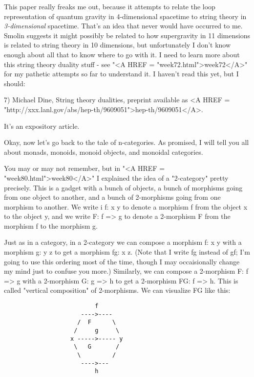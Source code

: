 This paper really freaks me out, because it attempts to relate the loop
representation of quantum gravity in 4-dimensional spacetime to string
theory in \emph{3-dimensional} spacetime.  That's an idea that never would
have occurred to me.  Smolin suggests it might possibly be related
to how supergravity in 11 dimensions is related to string theory in 10
dimensions, but unfortunately I don't know enough about all that to know
where to go with it.  I need to learn more about this string theory
duality stuff - see "<A HREF = "week72.html">week72</A>" for my pathetic attempts so far to
understand it.  I haven't read this yet, but I should:

7) Michael Dine, String theory dualities, preprint available as
<A HREF = "http://xxx.lanl.gov/abs/hep-th/9609051">hep-th/9609051</A>.  

It's an expository article.

Okay, now let's go back to the tale of n-categories.  As promised, I
will tell you all about monads, monoids, monoid objects, and monoidal
categories. 

You may or may not remember, but in "<A HREF = "week80.html">week80</A>" I explained the idea of a
"2-category" pretty precisely.  This is a gadget with a bunch of
objects, a bunch of morphisms going from one object to another, and a
bunch of 2-morphisms going from one morphism to another.  We write i
f: x \to  y to denote a morphism f from the object x to the object y, and we
write F: f => g to denote a 2-morphism F from the morphism f to the
morphism g.  

Just as in a category, in a 2-category we can compose a morphism f: x \to  y 
with a morphism g: y \to  z to get a morphism fg: x \to  z.  (Note that I
write fg instead of gf; I'm going to use this ordering most of the time,
though I may occaisionally change my mind just to confuse you more.) 
Similarly, we can compose a 2-morphism F: f => g with a 2-morphism G: g
=> h to get a 2-morphism FG: f => h.  This is called "vertical
composition" of 2-morphisms.   We can visualize FG like this:

\begin{verbatim}
                          f    
                      ---->----
                     /  F      \
                    /     g     \
                   x ----->----- y
                    \   G       /
                     \         /
                      ---->---
                          h

\end{verbatim}
    
